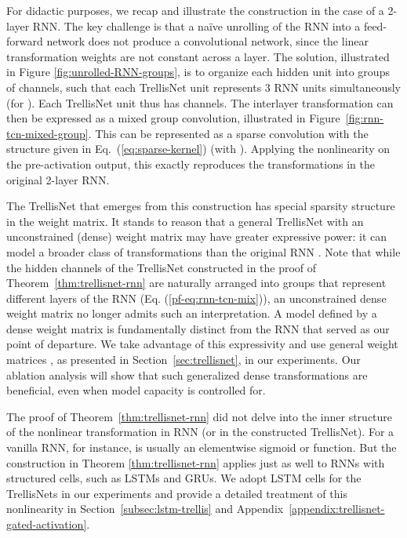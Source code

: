 \documentclass{article} \usepackage{iclr2019_conference,times}
\begin{document}
For didactic purposes, we recap and illustrate the construction in the case of a 2-layer RNN. The key challenge is that a na\"ive unrolling of the RNN into a feed-forward network does not produce a convolutional network, since the linear transformation weights are not constant across a layer. The solution, illustrated in Figure \ref{fig:unrolled-RNN-groups}, is to organize each hidden unit into groups of channels, such that each TrellisNet unit represents 3 RNN units simultaneously (for \small\normalsize). Each TrellisNet unit thus has  channels. The interlayer transformation can then be expressed as a mixed group convolution, illustrated in Figure~\ref{fig:rnn-tcn-mixed-group}. This can be represented as a sparse convolution with the structure given in Eq.~(\ref{eq:sparse-kernel}) (with ). Applying the nonlinearity  on the pre-activation output, this exactly reproduces the transformations in the original 2-layer RNN.

The TrellisNet that emerges from this construction has special sparsity structure in the weight matrix. It stands to reason that a general TrellisNet with an unconstrained (dense) weight matrix  may have greater expressive power: it can model a broader class of transformations than the original RNN . Note that while the hidden channels of the TrellisNet  constructed in the proof of Theorem~\ref{thm:trellisnet-rnn} are naturally arranged into groups that represent different layers of the RNN  (Eq. (\ref{pf-eq:rnn-tcn-mix})), an unconstrained dense weight matrix  no longer admits such an interpretation. A model defined by a dense weight matrix is fundamentally distinct from the RNN  that served as our point of departure. We take advantage of this expressivity and use general weight matrices , as presented in Section~\ref{sec:trellisnet}, in our experiments. Our ablation analysis will show that such generalized dense transformations are beneficial, even when model capacity is controlled for.

The proof of Theorem~\ref{thm:trellisnet-rnn} did not delve into the inner structure of the nonlinear transformation  in RNN (or  in the constructed TrellisNet). For a vanilla RNN, for instance,  is usually an elementwise sigmoid or  function. But the construction in Theorem \ref{thm:trellisnet-rnn} applies just as well to RNNs with structured cells, such as LSTMs and GRUs. We adopt LSTM cells for the TrellisNets in our experiments and provide a detailed treatment of this nonlinearity in Section~\ref{subsec:lstm-trellis} and Appendix~\ref{appendix:trellisnet-gated-activation}.
\end{document}

